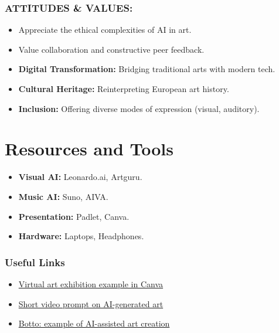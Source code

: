 \documentclass[11pt, a4paper]{article}
\begin{document}
\subsubsection*{ATTITUDES \& VALUES:}
\begin{itemize}
    \item Appreciate the ethical complexities of AI in art.
    \item Value collaboration and constructive peer feedback.
\end{itemize}

\begin{eurobox}
\begin{itemize}
    \item \textbf{Digital Transformation:} Bridging traditional arts with modern tech.
    \item \textbf{Cultural Heritage:} Reinterpreting European art history.
    \item \textbf{Inclusion:} Offering diverse modes of expression (visual, auditory).
\end{itemize}
\end{eurobox}

\newpage
\section{Resources and Tools}
\begin{itemize}
    \item \textbf{Visual AI:} Leonardo.ai, Artguru.
    \item \textbf{Music AI:} Suno, AIVA.
    \item \textbf{Presentation:} Padlet, Canva.
    \item \textbf{Hardware:} Laptops, Headphones.
\end{itemize}

\subsubsection*{Useful Links}
\begin{itemize}
    \item \href{https://www.canva.com/design/DAGp4QA1HZU/XiZdrWwJxfQ0qGWq2-MY-g/view?utm_content=DAGp4QA1HZU&utm_campaign=designshare&utm_medium=link2&utm_source=uniquelinks&utlId=h115aaa5c68}{Virtual art exhibition example in Canva}
    \item \href{https://www.youtube.com/shorts/QwCgzpVw3Rc}{Short video prompt on AI-generated art}
    \item \href{https://botto.com/}{Botto: example of AI-assisted art creation}
\end{itemize}
\end{document}
